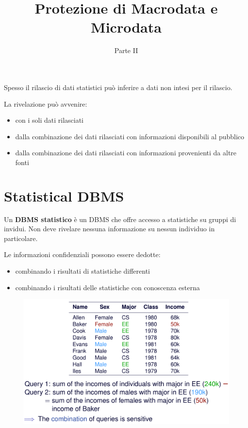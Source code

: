 \documentclass{report}
\title{Protezione di Macrodata e Microdata}
\date{Parte II}
\begin{document}
\maketitle

\tableofcontents
\newpage

Spesso il rilascio di dati statistici può inferire a dati non 
intesi per il rilascio.

La rivelazione può avvenire:
\begin{itemize}
    \item con i soli dati rilasciati
    \item dalla combinazione dei dati rilasciati con informazioni disponibili al pubblico
    \item dalla combinazione dei dati rilasciati con informazioni provenienti da altre fonti 
\end{itemize}


\chapter{Statistical DBMS}
Un \textbf{DBMS statistico} è un DBMS che offre accesso a statistiche 
su gruppi di invidui. Non deve rivelare nessuna informazione su nessun
individuo in particolare.

Le informazioni confidenziali possono essere dedotte:
\begin{itemize}
    \item combinando i risultati di statistiche differenti
    \item combinando i risultati delle statistiche con conoscenza esterna
\end{itemize} 

\begin{figure}[ht]
    \centering
    \includegraphics[width=1\linewidth]{images/stat-dbms.png}
\end{figure}
\end{document}
